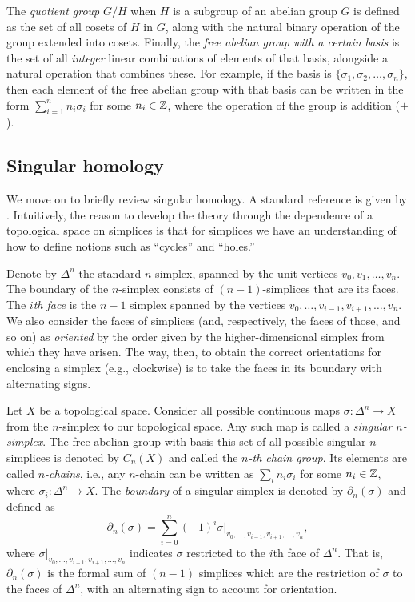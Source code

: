 \documentclass[11pt]{article}
\begin{document}
The {\em quotient group} $G/H$ when $H$ is a subgroup of an abelian group $G$ is defined as the set of all cosets of $H$ in $G$, along with the natural binary operation of the group extended into cosets. Finally, the {\em free abelian group with a certain basis} is the set of all \textit{integer} linear combinations of elements of that basis, alongside a natural operation that combines these. For example, if the basis is $\{\sigma_1,\sigma_2,\dots,\sigma_n\}$, then each element of the free abelian group with that basis can be written in the form $\sum\limits_{i=1}^n n_i \sigma_i$ for some $n_i\in{\mathbb{Z}}$, where the operation of the group is addition ($+$).

\subsection{Singular homology}
\label{app:singular}

We move on to briefly review singular homology. A standard reference is given by \citet{hatcher}. Intuitively, the reason to develop the theory through the dependence of a topological space on simplices is that for simplices we have an understanding of how to define notions such as ``cycles'' and ``holes.''

Denote by $\Delta^n$ the standard $n$-simplex, spanned by the unit vertices $v_0, v_1, \ldots, v_n$. The boundary of the $n$-simplex consists of $(n-1)$-simplices that are its faces. The {\em $i$th face} is the $n-1$ simplex spanned by the vertices $v_0,\ldots,v_{i-1},v_{i+1},\ldots,v_n$. We also consider the faces of simplices (and, respectively, the faces of those, and so on) as {\em oriented} by the order given by the higher-dimensional simplex from which they have arisen. The way, then, to obtain the correct orientations for enclosing a simplex (e.g., clockwise) is to take the faces in its boundary with alternating signs.

Let $X$ be a topological space. Consider all possible continuous maps $\sigma: \Delta^n\to X$ from the $n$-simplex to our topological space. Any such map is called a \emph{singular $n$-simplex}. The free abelian group with basis this set of all possible singular $n$-simplices is denoted by $C_n(X)$ and called the {\em $n$-th chain group}.
Its elements are called {\em $n$-chains}, i.e., any $n$-chain can be written as $\sum\limits_i n_i \sigma_i$ for some $n_i\in{\mathbb{Z}}$, where $\sigma_i: \Delta^n\to X$.
The \emph{boundary} of a singular simplex is denoted by $\partial_n(\sigma)$ and defined as 
\[
\partial_n(\sigma) = \sum_{i=0}^n (-1)^i \sigma|_{v_0,\ldots, v_{i-1},v_{i+1}, \ldots, v_n},
\]
where $\sigma|_{v_0,\ldots, v_{i-1},v_{i+1}, \ldots, v_n}$ indicates $\sigma$ restricted to the $i$th face of $\Delta^n$. That is, $\partial_n(\sigma)$ is the formal sum of $(n-1)$ simplices which are the restriction of $\sigma$ to the faces of $\Delta^n$, with an alternating sign to account for orientation. %
\end{document}
